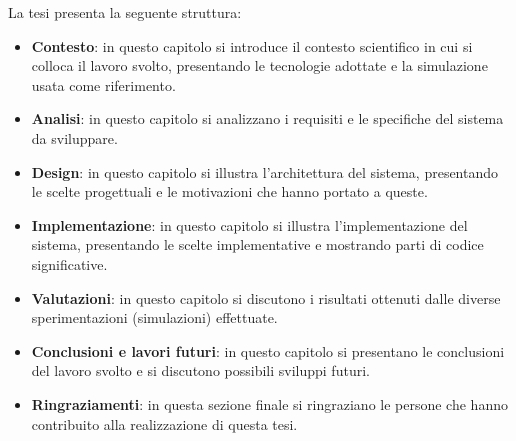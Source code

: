 
La tesi presenta la seguente struttura:
\begin{itemize}
    \item \textbf{Contesto}: in questo capitolo si introduce il contesto scientifico in cui si colloca il lavoro svolto,
    presentando le tecnologie adottate e la simulazione usata come riferimento.
    \item \textbf{Analisi}: in questo capitolo si analizzano i requisiti e le specifiche del sistema da sviluppare.
    \item \textbf{Design}: in questo capitolo si illustra l'architettura del sistema, presentando le scelte progettuali e le motivazioni che hanno portato a queste.
    \item \textbf{Implementazione}: in questo capitolo si illustra l'implementazione del sistema, presentando le scelte implementative e mostrando parti di codice significative.
    \item \textbf{Valutazioni}: in questo capitolo si discutono i risultati ottenuti dalle diverse sperimentazioni (simulazioni) effettuate.
    \item \textbf{Conclusioni e lavori futuri}: in questo capitolo si presentano le conclusioni del lavoro svolto e si discutono possibili sviluppi futuri.
    \item \textbf{Ringraziamenti}: in questa sezione finale si ringraziano le persone che hanno contribuito alla realizzazione di questa tesi.
\end{itemize}
